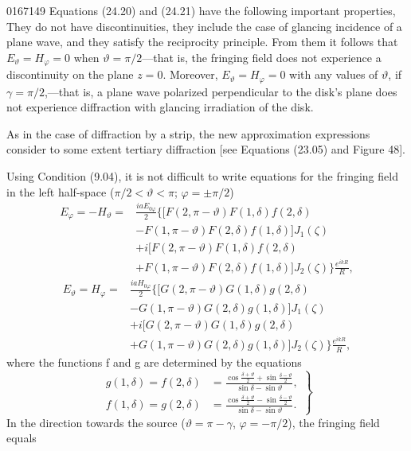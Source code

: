 \begin{scanpage}{0167}{149}
Equations (24.20) and (24.21) have the following important properties, They do not have discontinuities, they include the case of glancing incidence of a plane wave, and they satisfy the reciprocity principle. From them it follows that $E_\vartheta=H_\varphi=0$ when $\vartheta=\pi/2$---that is, the fringing field does not experience a discontinuity on the plane $z=0$. Moreover, $E_\vartheta=H_\varphi=0$ with any values of $\vartheta$, if $\gamma=\pi/2$,---that is, a plane wave polarized perpendicular to the disk's plane does not experience diffraction with glancing irradiation of the disk.

As in the case of diffraction by a strip, the new approximation expressions consider to some extent tertiary diffraction [see Equations (23.05) and Figure 48].

Using Condition (9.04), it is not difficult to write equations for the fringing field in the left half-space ($\pi/2<\vartheta<\pi$; $\varphi=\pm\pi/2$)
\[
\begin{aligned}E_\varphi=-H_\vartheta={}&\frac{iaE_{0\varphi}}2\bigl\{[F(2,\pi-\vartheta)F(1,\delta)f(2,\delta)\\&-F(1,\pi-\vartheta)F(2,\delta)f(1,\delta)]J_1(\zeta)\\&+i[F(2,\pi-\vartheta)F(1,\delta)f(2,\delta)\\&+F(1,\pi-\vartheta)F(2,\delta)f(1,\delta)]J_2(\zeta)\bigr\}\frac{e^{ikR}}R,
\end{aligned}\tag{24.23}
\]
\[
\begin{aligned}E_\vartheta=H_\varphi={}&\frac{iaH_{0\varphi}}2\bigl\{[G(2,\pi-\vartheta)G(1,\delta)g(2,\delta)\\&-G(1,\pi-\vartheta)G(2,\delta)g(1,\delta)]J_1(\zeta)\\&+i[G(2,\pi-\vartheta)G(1,\delta)g(2,\delta)\\&+G(1,\pi-\vartheta)G(2,\delta)g(1,\delta)]J_2(\zeta)\bigr\}\frac{e^{ikR}}R,
\end{aligned}\tag{24.23}
\]
where the functions f and g are determined by the equations
\[
\left.\begin{aligned}g(1,\delta)=f(2,\delta)&=\frac{\cos\frac{\delta+\vartheta}{2}+\sin\frac{\delta-\vartheta}{2}}{\sin\delta-\sin\vartheta},\\
f(1,\delta)=g(2,\delta)&=\frac{\cos\frac{\delta+\vartheta}{2}-\sin\frac{\delta-\vartheta}{2}}{\sin\delta-\sin\vartheta}.
\end{aligned}\right\}\tag{24.24}
\]
In the direction towards the source ($\vartheta=\pi-\gamma$, $\varphi=-\pi/2$), the fringing field equals
\end{scanpage}
